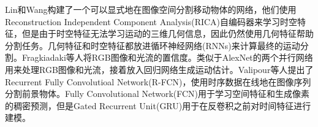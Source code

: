 Lin和Wang\cite{Lin2014Deep}构建了一个可以显式地在图像空间分割移动物体的网络，他们使用Reconstruction Independent Component Analysis(RICA)自编码器\cite{NIPS2011_4467,Le2013Building}来学习时空特征，但是由于时空特征无法学习运动的三维几何信息，因此仍然使用几何特征帮助分割任务。几何特征和时空特征都放进循环神经网络(RNNs)来计算最终的运动分割。Fragkiadaki等人\cite{Fragkiadaki2015Learning}将RGB图像和光流的置信度。类似于AlexNet\cite{Krizhevsky2012ImageNet}的两个并行网络用来处理RGB图像和光流，接着放入回归网络生成运动估计。Valipour等人\cite{Valipour2017Recurrent}提出了Recurrent Fully Convolutioal Network(R-FCN)，使用时序数据在线地在图像序列分割前景物体。Fully Convolutional Network(FCN)\cite{2014arXiv1411}用于学习空间特征和生成像素的稠密预测，但是Gated Recurrent Unit(GRU)用于在反卷积之前对时间特征进行建模。
